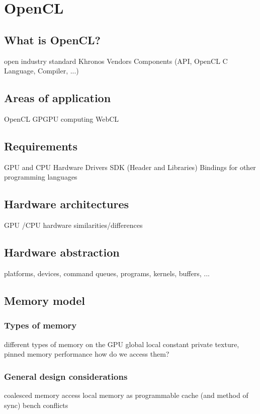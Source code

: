 \section{OpenCL}



\subsection{What is OpenCL?}
open industry standard
Khronos
Vendors
Components (API, OpenCL C Language, Compiler, ...)

\subsection{Areas of application}
OpenCL
GPGPU computing
WebCL

\subsection{Requirements}
GPU and CPU Hardware
Drivers
SDK (Header and Libraries)
Bindings for other programming languages

\subsection{Hardware architectures}

GPU /CPU hardware
similarities/differences

\subsection{Hardware abstraction}
platforms, devices, command queues, programs, kernels, buffers, ...

\subsection{Memory model}

\subsubsection{Types of memory}
different types of memory on the GPU
global local constant private
texture, pinned memory
performance
how do we access them?

\subsubsection{General design considerations}
coalesced memory access
local memory as programmable cache (and method of sync)
bench conflicts


